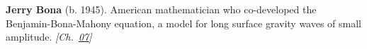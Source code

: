 \textbf{Jerry Bona} (b. 1945). American mathematician who co-developed the Benjamin-Bona-Mahony equation, a model for long surface gravity waves of small amplitude. \emph{[Ch.~\hyperref[ch:billiardsconicsporism]{07}]}

